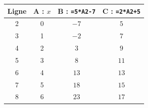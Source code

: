 \begin{center}\renewcommand{\arraystretch}{1.35}\begin{tabular}{c|ccc}\toprule
Ligne & A : $x$ & B : \texttt{=5*A2-7} & C : \texttt{=2*A2+5}\\\midrule
2 & 0 & $-7$ & $5$\\
3 & 1 & $-2$ & $7$\\
4 & 2 & $3$ & $9$\\
5 & 3 & $8$ & $11$\\
\geoSolution{\color{otGreenDark}}6 & \geoSolution{\color{otGreenDark}}4 & \geoSolution{\color{otGreenDark}}$13$ & \geoSolution{\color{otGreenDark}}$13$\\
7 & 5 & $18$ & $15$\\
8 & 6 & $23$ & $17$\\
\bottomrule\end{tabular}\end{center}\par{}
